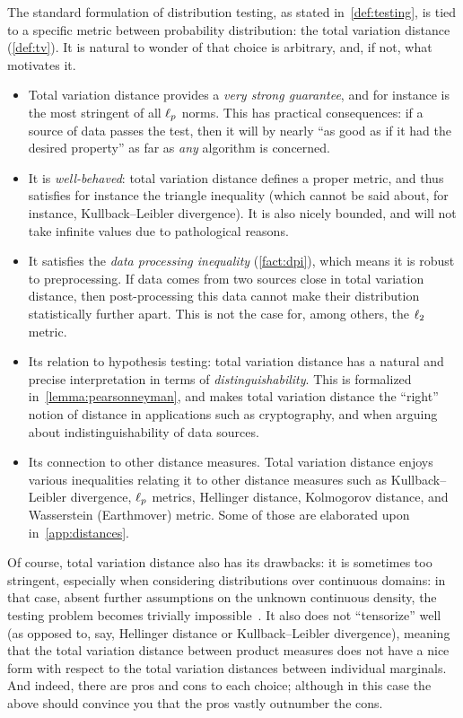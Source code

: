 The standard formulation of distribution testing, as stated in~\cref{def:testing}, is tied to a specific metric between probability distribution: the total variation distance (\cref{def:tv}). It is natural to wonder of that choice is arbitrary, and, if not, what motivates it.
\begin{itemize}
  \item Total variation distance provides a \emph{very strong guarantee}, and for instance is the most stringent of all $\lp[p]$ norms. This has practical consequences: if a source of data passes the test, then it will by nearly ``as good as if it had the desired property'' as far as \emph{any} algorithm is concerned. 
  \item It is \emph{well-behaved}: total variation distance defines a proper metric, and thus satisfies for instance the triangle inequality (which cannot be said about, for instance, Kullback--Leibler divergence). It is also nicely bounded, and will not take infinite values due to pathological reasons.
  \item It satisfies the \emph{data processing inequality} (\cref{fact:dpi}), which means it is robust to preprocessing. If data comes from two sources close in total variation distance, then post-processing this data cannot make their distribution statistically further apart. This is not the case for, among others, the $\lp[2]$ metric.
  \item Its relation to hypothesis testing: total variation distance has a natural and precise interpretation in terms of \emph{distinguishability}. This is formalized in~\cref{lemma:pearsonneyman}, and makes total variation distance the ``right'' notion of distance in applications such as cryptography, and when arguing about indistinguishability of data sources.
  \item Its connection to other distance measures. Total variation distance enjoys various inequalities relating it to other distance measures such as Kullback--Leibler divergence, $\lp[p]$ metrics, Hellinger distance, Kolmogorov distance, and Wasserstein (Earthmover) metric. Some of those are elaborated upon in~\cref{app:distances}.
\end{itemize}

Of course, total variation distance also has its drawbacks: it is sometimes too stringent, especially when considering distributions over continuous domains: in that case, absent further assumptions on the unknown continuous density, the testing problem becomes trivially impossible~\citep{LeCam73}. It also does not ``tensorize'' well (as opposed to, say, Hellinger distance or Kullback--Leibler divergence), meaning that the total variation distance between product measures does not have a nice form with respect to the total variation distances between individual marginals. And indeed, there are pros and cons to each choice; although in this case the above should convince you that the pros vastly outnumber the cons.

